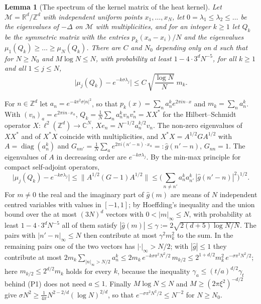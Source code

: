 \documentclass[11pt,a4paper]{article}
\makeatletter
\theoremstyle{stmt}
\newtheorem{lemma}[theorem]{Lemma}
\theoremstyle{defn}
\theoremstyle{rmk}
\renewenvironment{proof}[1][\proofname]{\par\pushQED{\qed}\normalfont\topsep6\p@\@plus6\p@\relax
  \trivlist\item[\hskip\labelsep{\sffamily\itshape\small #1.}]\ignorespaces}{\popQED\endtrivlist\@endpefalse}
\numberwithin{equation}{section}
\newcommand{\M}{\mathcal{M}}
\newcommand{\R}{\mathbb{R}}
\makeatother
\begin{document}
{\begin{lemma}[The spectrum of the kernel matrix of the heat kernel]\label{lem:kernelmatrix}
Let $\M=\R^d/\mathbb Z^d$ with independent uniform points $x_1,\dots,x_N$, let $0=\lambda_1\le\lambda_2\le\dots$ be the eigenvalues of $-\Delta$ on $\M$ with multiplicities, and for an integer $k\ge1$ let $Q_k$ be the symmetric matrix with the entries $p_k(x_a-x_i)/N$ and the eigenvalues $\mu_1(Q_k)\ge\dots\ge\mu_N(Q_k)$. There are $C$ and $N_0$ depending only on $d$ such that for $N\ge N_0$ and $M\log N\le N$, with probability at least $1-4\cdot3^dN^{-5}$, for all $k\ge1$ and all $1\le j\le N$,
\[
\big|\mu_j(Q_k)-e^{-k\sigma\lambda_j}\big|\le C\,\sqrt{\frac{\log N}{N}}\;m_k .
\]
\end{lemma}

\begin{proof}
For $n\in\mathbb Z^d$ let $a_n=e^{-4\pi^2\sigma|n|^2}$, so that $p_k(x)=\sum_na_n^ke^{2\pi in\cdot x}$ and $m_k=\sum_na_n^k$. With $(v_n)_a=e^{2\pi in\cdot x_a}$, $Q_k=\frac1N\sum_na_n^kv_nv_n^*=XX^*$ for the Hilbert--Schmidt operator $X\colon\ell^2(\mathbb Z^d)\to\mathbb C^N$, $Xe_n=N^{-1/2}a_n^{k/2}v_n$. The non-zero eigenvalues of $XX^*$ and of $X^*X$ coincide with multiplicities, and $X^*X=A^{1/2}GA^{1/2}$ with $A=\operatorname{diag}(a_n^k)$ and $G_{nn'}=\frac1N\sum_ae^{2\pi i(n'-n)\cdot x_a}=:\hat g(n'-n)$, $G_{nn}=1$. The eigenvalues of $A$ in decreasing order are $e^{-k\sigma\lambda_j}$. By the min-max principle for compact self-adjoint operators,
\[
\big|\mu_j(Q_k)-e^{-k\sigma\lambda_j}\big|\le\big\|A^{1/2}(G-1)A^{1/2}\big\|\le\Big(\sum_{n\ne n'}a_n^ka_{n'}^k\,|\hat g(n'-n)|^2\Big)^{1/2}.
\]
For $m\ne0$ the real and the imaginary part of $\hat g(m)$ are means of $N$ independent centred variables with values in $[-1,1]$; by Hoeffding's inequality and the union bound over the at most $(3N)^d$ vectors with $0<|m|_\infty\le N$, with probability at least $1-4\cdot3^dN^{-5}$ all of them satisfy $|\hat g(m)|\le\gamma:=2\sqrt{2(d+5)\log N/N}$. The pairs with $|n'-n|_\infty\le N$ then contribute at most $\gamma^2m_k^2$ to the sum. In the remaining pairs one of the two vectors has $|\cdot|_\infty>N/2$; with $|\hat g|\le1$ they contribute at most $2m_k\sum_{|n|_\infty>N/2}a_n^k\le2m_k\,e^{-k\sigma\pi^2N^2/2}\,m_{k/2}\le2^{1+d/2}m_k^2\,e^{-\sigma\pi^2N^2/2}$; here $m_{k/2}\le2^{d/2}m_k$ holds for every $k$, because the inequality $\gamma_a\le(t/a)^{d/2}\gamma_t$ behind (P1) does not need $a\le1$. Finally $M\log N\le N$ and $M\ge(2\pi\xi^2)^{-d/2}$ give $\sigma N^2\ge\frac1{4\pi}N^{2-2/d}(\log N)^{2/d}$, so that $e^{-\sigma\pi^2N^2/2}\le N^{-2}$ for $N\ge N_0$.
\end{proof}

}
\end{document}
